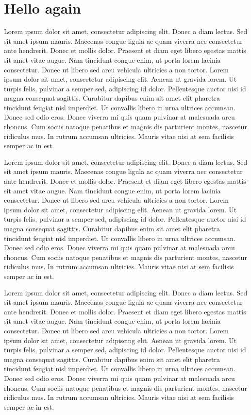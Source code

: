 \section{Hello again}
\label{sec:ch1-hello-again}

Lorem ipsum dolor sit amet, consectetur adipiscing elit. Donec a diam lectus.
Sed sit amet ipsum mauris. Maecenas congue ligula ac quam viverra nec
consectetur ante hendrerit. Donec et mollis dolor. Praesent et diam eget libero
egestas mattis sit amet vitae augue. Nam tincidunt congue enim, ut porta lorem
lacinia consectetur. Donec ut libero sed arcu vehicula ultricies a non tortor.
Lorem ipsum dolor sit amet, consectetur adipiscing elit. Aenean ut gravida
lorem. Ut turpis felis, pulvinar a semper sed, adipiscing id dolor. Pellentesque
auctor nisi id magna consequat sagittis. Curabitur dapibus enim sit amet elit
pharetra tincidunt feugiat nisl imperdiet. Ut convallis libero in urna ultrices
accumsan. Donec sed odio eros. Donec viverra mi quis quam pulvinar at malesuada
arcu rhoncus. Cum sociis natoque penatibus et magnis dis parturient montes,
nascetur ridiculus mus. In rutrum accumsan ultricies. Mauris vitae nisi at sem
facilisis semper ac in est.

Lorem ipsum dolor sit amet, consectetur adipiscing elit. Donec a diam lectus.
Sed sit amet ipsum mauris. Maecenas congue ligula ac quam viverra nec
consectetur ante hendrerit. Donec et mollis dolor. Praesent et diam eget libero
egestas mattis sit amet vitae augue. Nam tincidunt congue enim, ut porta lorem
lacinia consectetur. Donec ut libero sed arcu vehicula ultricies a non tortor.
Lorem ipsum dolor sit amet, consectetur adipiscing elit. Aenean ut gravida
lorem. Ut turpis felis, pulvinar a semper sed, adipiscing id dolor. Pellentesque
auctor nisi id magna consequat sagittis. Curabitur dapibus enim sit amet elit
pharetra tincidunt feugiat nisl imperdiet. Ut convallis libero in urna ultrices
accumsan. Donec sed odio eros. Donec viverra mi quis quam pulvinar at malesuada
arcu rhoncus. Cum sociis natoque penatibus et magnis dis parturient montes,
nascetur ridiculus mus. In rutrum accumsan ultricies. Mauris vitae nisi at sem
facilisis semper ac in est.

Lorem ipsum dolor sit amet, consectetur adipiscing elit. Donec a diam lectus.
Sed sit amet ipsum mauris. Maecenas congue ligula ac quam viverra nec
consectetur ante hendrerit. Donec et mollis dolor. Praesent et diam eget libero
egestas mattis sit amet vitae augue. Nam tincidunt congue enim, ut porta lorem
lacinia consectetur. Donec ut libero sed arcu vehicula ultricies a non tortor.
Lorem ipsum dolor sit amet, consectetur adipiscing elit. Aenean ut gravida
lorem. Ut turpis felis, pulvinar a semper sed, adipiscing id dolor. Pellentesque
auctor nisi id magna consequat sagittis. Curabitur dapibus enim sit amet elit
pharetra tincidunt feugiat nisl imperdiet. Ut convallis libero in urna ultrices
accumsan. Donec sed odio eros. Donec viverra mi quis quam pulvinar at malesuada
arcu rhoncus. Cum sociis natoque penatibus et magnis dis parturient montes,
nascetur ridiculus mus. In rutrum accumsan ultricies. Mauris vitae nisi at sem
facilisis semper ac in est.

